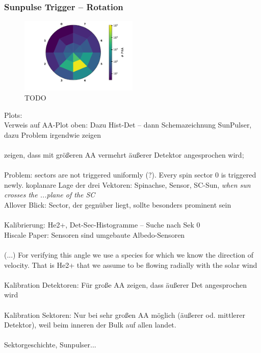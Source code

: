%
%





	

\subsubsection{Sunpulse Trigger -- Rotation}
\begin{figure}[h]
	\includegraphics[width=0.5\textwidth]{Figures/hist_det_sec_aa_90days2001}
	\centering
	\caption{TODO}
	\label{TODO}
\end{figure}
Plots: \\ 
Verweis auf AA-Plot oben: Dazu Hist-Det -- dann Schemazeichnung SunPulser, dazu Problem irgendwie zeigen
\\ \\
zeigen, dass mit größeren AA vermehrt äußerer Detektor angesprochen wird; 
\\ \\
Problem: sectors are not triggered uniformly (?). Every spin sector 0 is triggered newly. koplanare Lage der drei Vektoren: Spinachse, Sensor, SC-Sun, \textit{when sun crosses the ...plane of the SC}\\
Allover Blick: Sector, der gegnüber liegt, sollte besonders prominent sein
\\ \\
Kalibrierung: He2+, Det-Sec-Histogramme -- Suche nach Sek 0
\\ Hiscale Paper: Sensoren sind umgebaute Albedo-Sensoren
\\ \\
(...) For verifying this angle we use a species for which we know the direction of velocity. That is He2+ that we assume to be flowing radially with the solar wind
\\ \\
Kalibration Detektoren: Für große AA zeigen, dass äußerer Det angesprochen wird
\\ \\
Kalibration Sektoren: Nur bei sehr großen AA möglich (äußerer od. mittlerer Detektor), weil beim inneren der Bulk auf allen landet.
\\ \\
Sektorgeschichte, Sunpulser...

